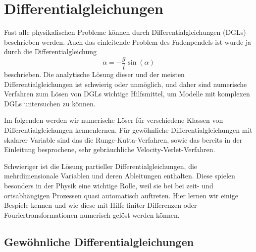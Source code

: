% 

\chapter{Differentialgleichungen}

Fast alle physikalischen Probleme können durch Differentialgleichungen
(DGLs) beschrieben werden. Auch das einleitende Problem des
Fadenpendels ist wurde ja durch die Differentialgleichung
\begin{equation}
  \ddot\alpha = -\frac{g}{l}\sin(\alpha)
\end{equation}
beschrieben. Die analytische Lösung dieser und der meisten
Differentialgleichungen ist schwierig oder unmöglich, und daher sind
numerische Verfahren zum Lösen von DGLs wichtige Hilfsmittel, um
Modelle mit komplexen DGLs untersuchen zu können.

Im folgenden werden wir numerische Löser für verschiedene Klassen von
Differentialgleichungen kennenlernen. Für gewöhnliche
Differentialgleichungen mit skalarer Variable sind das die
Runge-Kutta-Verfahren, sowie das bereits in der Einleitung
besprochene, sehr gebräuchliche Velocity-Verlet-Verfahren.

Schwieriger ist die Lösung partieller Differentialgleichungen, die
mehrdimensionale Variablen und deren Ableitungen enthalten.  Diese
spielen besonders in der Physik eine wichtige Rolle, weil sie bei bei
zeit- und ortsabhängigen Prozessen quasi automatisch auftreten. Hier
lernen wir einige Bespiele kennen und wie diese mit Hilfe finiter
Differenzen oder Fouriertransformationen numerisch gelöst werden
können.

\section{Gewöhnliche Differentialgleichungen}


